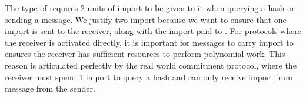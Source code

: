 The type of \Fropp requires 2 units of import to be given to it when querying a hash or sending a message.
We justify two import because we want to ensure that one import is sent to the receiver, along with the import paid to \Fropp. For protocols where the receiver is activated directly, it 
is important for messages to carry import to ensures the receiver has sufficient resources to perform polynomial work. 
This reason is articulated perfectly by the real world commitment protocol, where the receiver must spend 1 import to query a hash and can only receive import from message from the sender.


